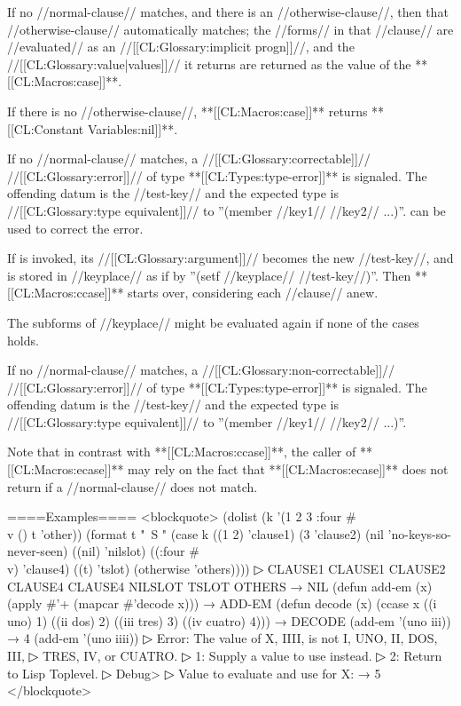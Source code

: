 \beginlist


If no //normal-clause// matches, and there is an //otherwise-clause//, then that //otherwise-clause// automatically matches; the //forms// in that //clause// are //evaluated// as an //[[CL:Glossary:implicit progn]]//, and the //[[CL:Glossary:value|values]]// it returns are returned as the value of the **[[CL:Macros:case]]**.

If there is no //otherwise-clause//, **[[CL:Macros:case]]** returns **[[CL:Constant Variables:nil]]**.


If no //normal-clause// matches, a //[[CL:Glossary:correctable]]// //[[CL:Glossary:error]]// of type **[[CL:Types:type-error]]** is signaled. The offending datum is the //test-key// and the expected type is //[[CL:Glossary:type equivalent]]// to ''(member //key1// //key2// ...)''.  can be used to correct the error.

If  is invoked, its //[[CL:Glossary:argument]]// becomes the new //test-key//, and is stored in //keyplace// as if by ''(setf //keyplace// //test-key//)''. Then **[[CL:Macros:ccase]]** starts over, considering each //clause// anew.


The subforms of //keyplace// might be evaluated again if none of the cases holds.


If no //normal-clause// matches, a //[[CL:Glossary:non-correctable]]// //[[CL:Glossary:error]]// of type **[[CL:Types:type-error]]** is signaled. The offending datum is the //test-key// and the expected type is //[[CL:Glossary:type equivalent]]// to ''(member //key1// //key2// ...)''.

Note that in contrast with **[[CL:Macros:ccase]]**, the caller of **[[CL:Macros:ecase]]** may rely on the fact that **[[CL:Macros:ecase]]** does not return if a //normal-clause// does not match.

\endlist

====Examples====
<blockquote> (dolist (k '(1 2 3 :four #\\v () t 'other)) (format t "~S " (case k ((1 2) 'clause1) (3 'clause2) (nil 'no-keys-so-never-seen) ((nil) 'nilslot) ((:four #\\v) 'clause4) ((t) 'tslot) (otherwise 'others))))
▷ CLAUSE1 CLAUSE1 CLAUSE2 CLAUSE4 CLAUSE4 NILSLOT TSLOT OTHERS → NIL (defun add-em (x) (apply #'+ (mapcar #'decode x))) → ADD-EM (defun decode (x) (ccase x ((i uno) 1) ((ii dos) 2) ((iii tres) 3) ((iv cuatro) 4))) → DECODE (add-em '(uno iii)) → 4 (add-em '(uno iiii))
▷ Error: The value of X, IIII, is not I, UNO, II, DOS, III,
▷ TRES, IV, or CUATRO.
▷ 1: Supply a value to use instead.
▷ 2: Return to Lisp Toplevel.
▷ Debug> 
▷ Value to evaluate and use for X:  → 5 </blockquote>

